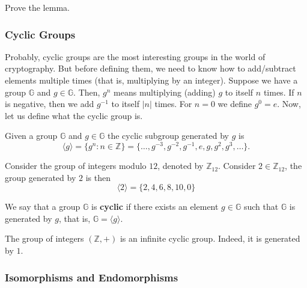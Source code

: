 \documentclass[../lecture-notes.tex]{subfiles}
\begin{document}
\begin{exercise}
    Prove the lemma.
\end{exercise}

\subsubsection{Cyclic Groups}

Probably, cyclic groups are the most interesting groups in the world of cryptography. But before defining them, we need to know how to add/subtract elements multiple times (that is, multiplying by an integer). Suppose 
we have a group $\mathbb{G}$ and $g \in \mathbb{G}$. Then, $g^n$ means multiplying (adding) $g$ to itself $n$ times. If $n$ is negative, then we add $g^{-1}$ to itself $|n|$ times. For $n=0$ we define $g^0 = e$. Now, let us define what the cyclic group is.
\begin{definition}
    Given a group $\mathbb{G}$ and $g \in \mathbb{G}$ the cyclic subgroup generated by $g$ is
    \begin{equation}
        \langle g \rangle = \{g^n: n \in \mathbb{Z}\} = \{\dots,g^{-3}, g^{-2}, g^{-1}, e, g, g^2, g^3, \dots\}.
    \end{equation}
\end{definition}

\begin{example}
    Consider the group of integers modulo $12$, denoted by $\mathbb{Z}_{12}$. Consider $2 \in \mathbb{Z}_{12}$, the group generated by $2$ is then
    \begin{equation}
        \langle 2 \rangle = \{2,4,6,8,10, 0\}
    \end{equation}
\end{example}

\begin{definition}
    We say that a group $\mathbb{G}$ is \textbf{cyclic} if there exists an element $g \in \mathbb{G}$ such that $\mathbb{G}$ is generated by $g$, that is, $\mathbb{G} = \langle g \rangle$.
\end{definition}

\begin{example}
    The group of integers $(\mathbb{Z},+)$ is an infinite cyclic group. Indeed, it is generated by $1$.
\end{example}

\subsubsection{Isomorphisms and Endomorphisms}
\end{document}
